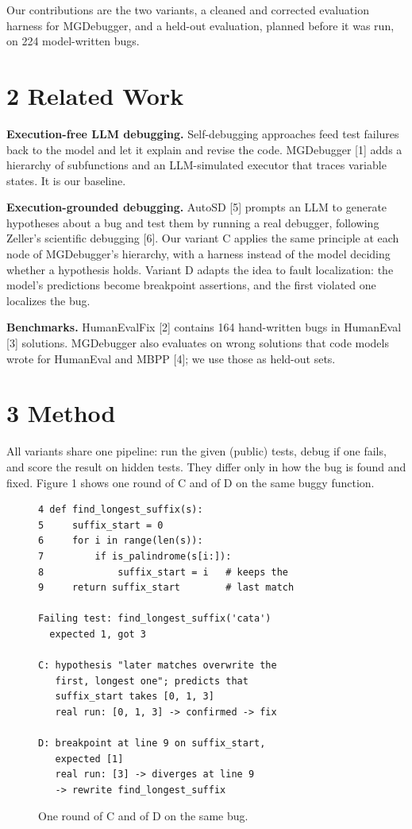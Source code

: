 \documentclass[
  10pt,
  twocolumn]{article}
\begin{document}
Our contributions are the two variants, a cleaned and corrected
evaluation harness for MGDebugger, and a held-out evaluation, planned
before it was run, on 224 model-written bugs.

\hypertarget{related-work}{%
\section{2 Related Work}\label{related-work}}

\textbf{Execution-free LLM debugging.} Self-debugging approaches feed
test failures back to the model and let it explain and revise the code.
MGDebugger {[}1{]} adds a hierarchy of subfunctions and an LLM-simulated
executor that traces variable states. It is our baseline.

\textbf{Execution-grounded debugging.} AutoSD {[}5{]} prompts an LLM to
generate hypotheses about a bug and test them by running a real
debugger, following Zeller's scientific debugging {[}6{]}. Our variant C
applies the same principle at each node of MGDebugger's hierarchy, with
a harness instead of the model deciding whether a hypothesis holds.
Variant D adapts the idea to fault localization: the model's predictions
become breakpoint assertions, and the first violated one localizes the
bug.

\textbf{Benchmarks.} HumanEvalFix {[}2{]} contains 164 hand-written bugs
in HumanEval {[}3{]} solutions. MGDebugger also evaluates on wrong
solutions that code models wrote for HumanEval and MBPP {[}4{]}; we use
those as held-out sets.

\hypertarget{method}{%
\section{3 Method}\label{method}}

All variants share one pipeline: run the given (public) tests, debug if
one fails, and score the result on hidden tests. They differ only in how
the bug is found and fixed. Figure 1 shows one round of C and of D on
the same buggy function.

\begin{figure}[t]\footnotesize
\begin{verbatim}
4 def find_longest_suffix(s):
5     suffix_start = 0
6     for i in range(len(s)):
7         if is_palindrome(s[i:]):
8             suffix_start = i   # keeps the
9     return suffix_start        # last match

Failing test: find_longest_suffix('cata')
  expected 1, got 3

C: hypothesis "later matches overwrite the
   first, longest one"; predicts that
   suffix_start takes [0, 1, 3]
   real run: [0, 1, 3] -> confirmed -> fix

D: breakpoint at line 9 on suffix_start,
   expected [1]
   real run: [3] -> diverges at line 9
   -> rewrite find_longest_suffix
\end{verbatim}
\caption{One round of C and of D on the same bug.}
\end{figure}
\end{document}
